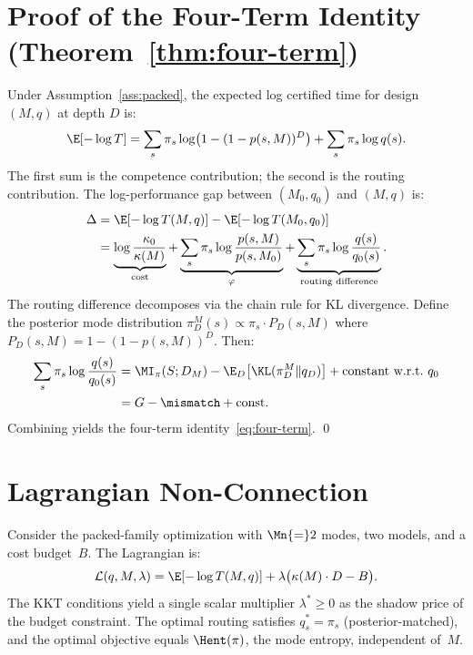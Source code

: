 
\appendix

\section{Proof of the Four-Term Identity (Theorem~\ref{thm:four-term})}
\label{app:four-term}

Under Assumption~\ref{ass:packed}, the expected log certified time for
design $(M, q)$ at depth $D$ is:
\begin{equation}
  \E[-\log T] = \sum_s \pi_s \log\bigl(1 - (1 - p(s,M))^D\bigr)
    + \sum_s \pi_s \log q(s).
\end{equation}
The first sum is the competence contribution; the second is the routing
contribution.  The log-performance gap between $(M_0, q_0)$ and $(M, q)$
is:
\begin{align}
  \Delta &= \E[-\log T(M,q)] - \E[-\log T(M_0, q_0)] \nonumber \\
  &= \underbrace{\log\frac{\kappa_0}{\kappa(M)}}_{\text{cost}}
    + \underbrace{\sum_s \pi_s \log\frac{p(s,M)}{p(s,M_0)}}_{\varphi}
    + \underbrace{\sum_s \pi_s \log\frac{q(s)}{q_0(s)}}_{\text{routing difference}}.
\end{align}
The routing difference decomposes via the chain rule for KL divergence.
Define the posterior mode distribution $\pi_D^M(s) \propto \pi_s \cdot
P_D(s,M)$ where $P_D(s,M) = 1 - (1-p(s,M))^D$.  Then:
\begin{align}
  \sum_s \pi_s \log\frac{q(s)}{q_0(s)}
  &= \MI_\pi(S; D_M)
    - \E_D\bigl[\KL(\pi_D^M \| q_D)\bigr]
    + \text{constant w.r.t.\ } q_0 \nonumber \\
  &= G - \mismatch + \text{const}.
\end{align}
Combining yields the four-term identity~\eqref{eq:four-term}. \qed

\section{Lagrangian Non-Connection}
\label{app:lagrangian}

Consider the packed-family optimization with $\Mn{=}2$ modes, two models,
and a cost budget~$B$.  The Lagrangian is:
\[
  \mathcal{L}(q, M, \lambda) = \E[-\log T(M, q)]
    + \lambda\bigl(\kappa(M) \cdot D - B\bigr).
\]
The KKT conditions yield a single scalar multiplier $\lambda^* \ge 0$
as the shadow price of the budget constraint.  The optimal routing satisfies
$q_s^* = \pi_s$ (posterior-matched), and the optimal objective equals
$\Hent(\pi)$, the mode entropy, independent of~$M$.

